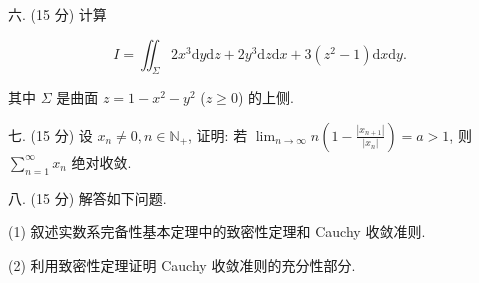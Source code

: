 \documentclass{examcollection}
\renewcommand{\displayformula}[1]{\[#1\]}
\begin{document}
{\begin{minipage}{\textwidth}
六. (15 分) 计算\par
\displayformula{I = \iint_ {\Sigma} 2 x ^ {3} \mathrm{d} y \mathrm{d} z + 2 y ^ {3} \mathrm{d} z \mathrm{d} x + 3 (z ^ {2} - 1) \mathrm{d} x \mathrm{d} y.}\par
其中 $\Sigma$ 是曲面 $z = 1 - x^{2} - y^{2}$ ($z \geq 0$) 的上侧.\par
七. (15 分) 设 $x_{n} \neq 0, n \in \mathbb{N}_{+}$, 证明: 若 $\lim_{n \to \infty} n\left(1 - \frac{|x_{n+1}|}{|x_{n}|}\right) = a > 1$, 则 $\sum_{n=1}^{\infty} x_{n}$ 绝对收敛.\par
八. (15 分) 解答如下问题.\par
(1) 叙述实数系完备性基本定理中的致密性定理和 Cauchy 收敛准则.\par
(2) 利用致密性定理证明 Cauchy 收敛准则的充分性部分.\par
\end{minipage}}
\ifdim\dimexpr\ht\proofbox+\dp\proofbox\relax>\textheight
\noindent\resizebox{!}{\textheight}{\usebox{\proofbox}}\else\noindent\usebox{\proofbox}\fi\clearpage
\end{document}
